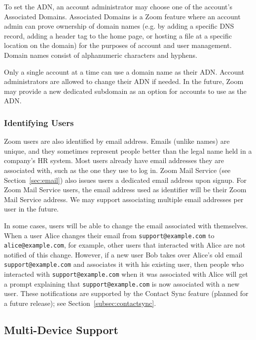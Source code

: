 To set the ADN, an account administrator may choose one of the account's Associated Domains.
Associated Domains is a Zoom feature where an account admin can prove ownership of domain names
(e.g. by adding a specific DNS record, adding a header tag to the home page, or hosting a file at a
specific location on the domain) for the purposes of account and user management. Domain names
consist of alphanumeric characters and hyphens. 

Only a single account at a time can use a domain name as their ADN. Account administrators are
allowed to change their ADN if needed. In the future, Zoom may provide a new dedicated subdomain as
an option for accounts to use as the ADN.

\subsubsection{Identifying Users}

Zoom users are also identified by email address. Emails (unlike names) are unique, and they
sometimes represent people better than the legal name held in a company's HR system. Most users
already have email addresses they are associated with, such as the one they use to log in. Zoom Mail
Service (see Section~\ref{sec:email}) also issues users a dedicated email address upon signup. For
Zoom Mail Service users, the email address used as identifier will be their Zoom Mail Service
address. We may support associating multiple email addresses per user in the future.

In some cases, users will be able to change the email associated with themselves. When a user Alice
changes their email from \texttt{support@example.com} to \texttt{alice@example.com}, for example,
other users that interacted with Alice are not notified of this change. However, if a new user Bob
takes over Alice's old email \texttt{support@example.com} and associates it with his existing user,
then people who interacted with \texttt{support@example.com} when it was associated with Alice will
get a prompt explaining that \texttt{support@example.com} is now associated with a new user. These
notifications are supported by the Contact Sync feature (planned for a future release); see
Section~\ref{subsec:contactsync}.

\subsection{Multi-Device Support}
\label{subsec:multidev}

